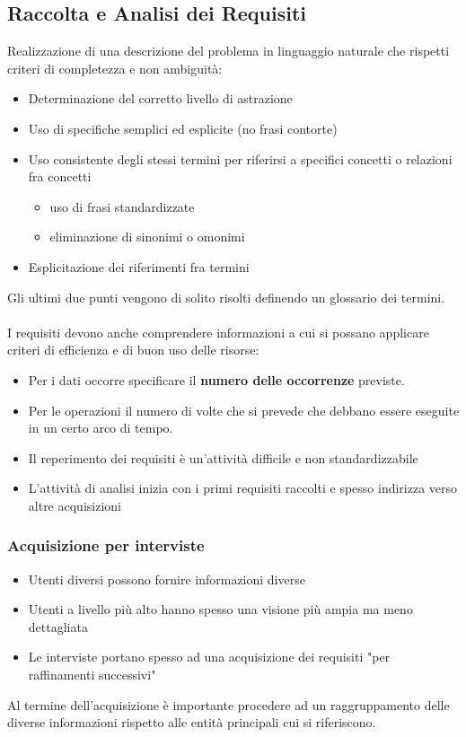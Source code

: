 \documentclass[../main.tex]{subfiles}
\begin{document}
	\subsection{Raccolta e Analisi dei Requisiti}
	Realizzazione di una descrizione del problema in linguaggio naturale che rispetti criteri di completezza e non ambiguità:
	\begin{itemize}
		\item Determinazione del corretto livello di astrazione
		\item Uso di specifiche semplici ed esplicite (no frasi contorte)
		\item Uso consistente degli stessi termini per riferirsi a specifici concetti o relazioni fra concetti
		\begin{itemize}
			\item uso di frasi standardizzate
			\item eliminazione di sinonimi o omonimi
	\end{itemize}
		\item Esplicitazione dei riferimenti fra termini
	\end{itemize}
	Gli ultimi due punti vengono di solito risolti definendo un
	glossario dei termini.\\\\
	I requisiti devono anche comprendere informazioni a
	cui si possano applicare criteri di efficienza e di buon
	uso delle risorse:
	\begin{itemize}
		\item Per i dati occorre specificare il \textbf{numero delle occorrenze} previste.
		\item Per le operazioni il numero di volte che si prevede che debbano essere eseguite in un certo arco di tempo.
		\item Il reperimento dei requisiti è un'attività difficile e non standardizzabile
		\item L'attività di analisi inizia con i primi requisiti raccolti e spesso indirizza verso altre acquisizioni
	\end{itemize}
	\subsubsection{Acquisizione per interviste}
	\begin{itemize}
		\item Utenti diversi possono fornire informazioni diverse
		\item Utenti a livello più alto hanno spesso una visione più ampia ma meno dettagliata
		\item Le interviste portano spesso ad una acquisizione dei requisiti "per raffinamenti successivi"
	\end{itemize}
	Al termine dell’acquisizione è importante procedere ad un raggruppamento delle diverse informazioni rispetto alle entità principali cui si riferiscono.
\end{document}
